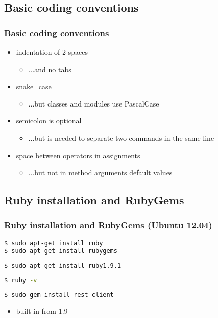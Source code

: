 \subsection{Basic coding conventions}
\begin{frame}\frametitle{Basic coding conventions}

\begin{itemize}

\item<1-> indentation of 2 spaces
\begin{itemize}
\item ...and no tabs
\end{itemize}

\item<2-> snake\_case
\begin{itemize}
\item ...but classes and modules use PascalCase
\end{itemize}

\item<3-> semicolon is optional
\begin{itemize}
\item ...but is needed to separate two commands in the same line
\end{itemize}

\item<4-> space between operators in assignments
\begin{itemize}
\item ...but not in method arguments default values
\end{itemize}

\end{itemize}

\end{frame}




\subsection{Ruby installation and RubyGems}
\begin{frame}[fragile]\frametitle{Ruby installation and RubyGems (Ubuntu 12.04)}

\begin{lstlisting}[language=bash, escapechar={^}]
$ sudo apt-get install ruby
$ sudo apt-get install rubygems
\end{lstlisting}
\pause
\begin{lstlisting}[language=bash, escapechar={^}]
$ sudo apt-get install ruby1.9.1
\end{lstlisting}
\pause
\begin{lstlisting}[language=bash, escapechar={^}]
$ ruby -v
\end{lstlisting}
\pause
\begin{lstlisting}[language=bash, escapechar={^}]
$ sudo gem install rest-client
\end{lstlisting}
\pause
\begin{itemize}
  \item built-in from 1.9
\end{itemize}

\end{frame}




